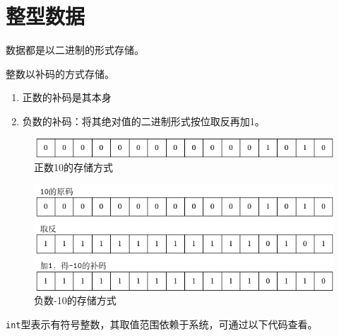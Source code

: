 \section{整型数据}


\begin{frame}
数据都是以二进制的形式存储。\vspace{0.1in}

整数以补码的方式存储。\vspace{0.1in}

\begin{enumerate}
\item
正数的补码是其本身\\[0.1in]
\item 
负数的补码：将其绝对值的二进制形式按位取反再加1。
\end{enumerate}
\end{frame}
%
\begin{frame}

  \begin{figure}
    \centering
    \includegraphics[]{ch03/images/positive_storage}
    \caption{正数10的存储方式}
  \end{figure}
%   
  \begin{figure}
    \centering
    \includegraphics[]{ch03/images/negative_storage}
    \caption{负数-10的存储方式}
  \end{figure}
\end{frame}
\begin{frame}[fragile]
\lstinline|int|型表示有符号整数，其取值范围依赖于系统，可通过以下代码查看。


\end{frame}


